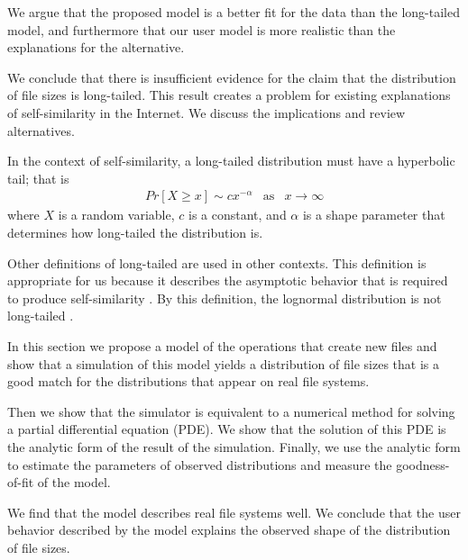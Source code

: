 \documentclass[10pt,twocolumn]{article}
\begin{document}
We argue that the proposed model is a better fit for the data than the
long-tailed model, and furthermore that our user model is more
realistic than the explanations for the alternative.

We conclude that there is insufficient evidence for the claim that the
distribution of file sizes is long-tailed.  This result creates a
problem for existing explanations of self-similarity in the Internet.
We discuss the implications and review alternatives.


In the context of self-similarity, a long-tailed
distribution must have a hyperbolic tail; that is
%
\begin{eqnarray}
Pr[X \ge x] \sim c x^{-\alpha} & \mbox{as} & x \rightarrow \infty
\label{eqn.long}
\end{eqnarray}
%
where $X$ is a random variable, $c$ is a
constant, and $\alpha$ is a shape parameter that
determines how long-tailed the distribution is.

Other definitions of long-tailed are used in other contexts.  This
definition is appropriate for us because it describes the asymptotic
behavior that is required to produce self-similarity
\cite{TaqquWillingerSherman97}.  By this definition, the lognormal
distribution is not long-tailed \cite{PaxsonFloyd95}.



In this section we propose a model of the operations that create new
files and show that a simulation of this model yields a distribution
of file sizes that is a good match for the distributions that appear
on real file systems.

Then we show that the simulator is equivalent to a numerical
method for solving a partial differential equation (PDE).  We show
that the solution of this PDE is the analytic form of the
result of the simulation.  Finally, we use the analytic form
to estimate the parameters of observed distributions and measure
the goodness-of-fit of the model.

We find that the model describes real file systems well.
We conclude that the user behavior
described by the model explains the observed shape of the
distribution of file sizes.


\label{usermodel}
\end{document}
